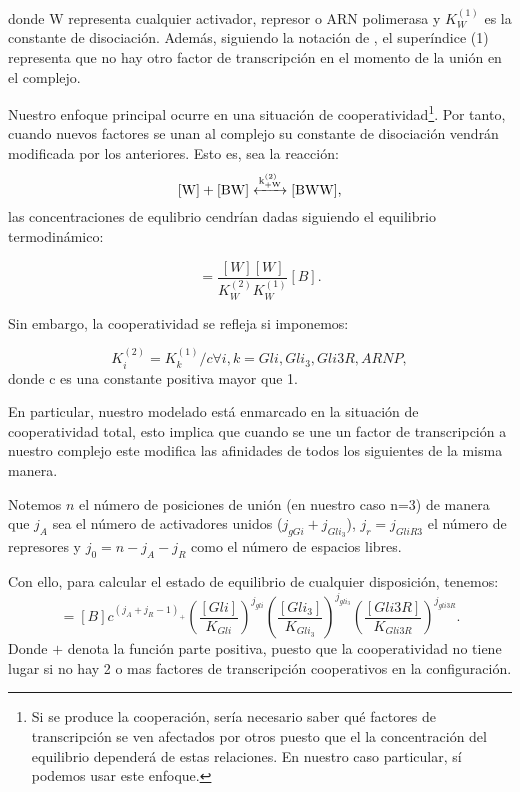 donde W representa cualquier activador, represor o ARN polimerasa y $K^{(1)}_W$ es la constante de disociación. Además, siguiendo la notación de \cite{cambon1}, el superíndice (1) representa que no hay otro factor de transcripción en el momento de la unión en el complejo. 

Nuestro enfoque principal ocurre en una situación de cooperatividad\footnote{Si se produce la cooperación, sería necesario saber qué factores de transcripción se ven afectados por otros puesto que el  la concentración del equilibrio dependerá de estas relaciones. En nuestro caso particular, sí podemos usar este enfoque.}. Por tanto, cuando nuevos factores se unan al complejo su constante de disociación vendrán modificada por los anteriores. Esto es, sea la reacción:
\begin{equation}
\ce{[W] + [BW] <->[k^{(2)}_{+W}] [BWW] },
\label{s:125}
\end{equation}
las concentraciones de equlibrio cendrían dadas siguiendo el equilibrio termodinámico:

\begin{equation}
[BWW]=\frac{[W][W]}{K_{W}^{(2)}K_{W}^{(1)}}[B].
\end{equation}


Sin embargo, la cooperatividad se refleja si imponemos: 

$$K_i^{(2)}=K_k^{(1)}/c \forall i,k= Gli,Gli_3,Gli3R,ARNP,$$
donde c es una constante positiva mayor que 1. 

En particular, nuestro modelado está enmarcado en la situación de cooperatividad total, esto implica que cuando se une un factor de transcripción a nuestro complejo este modifica las afinidades de todos los siguientes de la misma manera.


Notemos $n$ el número de posiciones de unión (en nuestro caso n=3) de manera que $j_A$ sea el número de activadores unidos ($j_{gGi}+j_{Gli_3}$), $j_r=j_{GliR3}$ el número de represores y $j_0=n-j_A-j_R$ como el número de espacios libres.  

Con ello, para calcular el estado de equilibrio de cualquier disposición, tenemos:
\begin{equation}
[BGli^{j_{Gli}}Gli_3^{j_{Gli_3}}Gli3R^{j_{Gli3R}}]=[B]c^{(j_A+j_R-1)_+}\left(\frac{[Gli]}{K_{Gli}}\right)^{j_{gli}}
\left(\frac{[Gli_3]}{K_{Gli_3}}\right)^{j_{gli_3}}
\left(\frac{[Gli3R]}{K_{Gli3R}}\right)^{j_{gli3R}}.
\label{eqa}
\end{equation}
Donde $+$ denota la función parte positiva, puesto que la cooperatividad no tiene lugar si no hay 2 o mas factores de transcripción cooperativos en la configuración.

